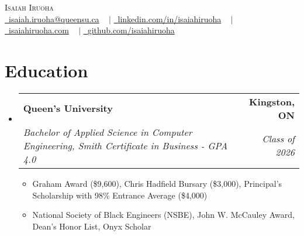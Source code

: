 \documentclass[letterpaper,11pt]{article}
\makeatletter
\newcommand{\resumeItem}[1]{
  \item\small{
    {#1 \vspace{-2pt}}
  }
}
\newcommand{\resumeSubheading}[4]{
  \vspace{-2pt}\item
    \begin{tabular*}{1.0\textwidth}[t]{l@{\extracolsep{\fill}}r}
      \textbf{#1} & \textbf{\small #2} \\
      \textit{\small#3} & \textit{\small #4} \\
    \end{tabular*}\vspace{-7pt}
}
\newcommand{\resumeSubHeadingListStart}{\begin{itemize}[leftmargin=0.0in, label={}]}
\newcommand{\resumeSubHeadingListEnd}{\end{itemize}}
\newcommand{\resumeItemListStart}{\begin{itemize}}
\newcommand{\resumeItemListEnd}{\end{itemize}\vspace{-5pt}}
\makeatother
\begin{document}

\begin{center}
    {\Huge \scshape Isaiah Iruoha} \\ \vspace{5pt}
    \href{mailto:x@gmail.com}{\raisebox{-0.2\height}\  {isaiah.iruoha@queensu.ca}} ~ $\vert$
    \href{https://isaiahiruoha.com}{\raisebox{-0.2\height}\ {linkedin.com/in/isaiahiruoha}}  ~ $\vert$
    \href{https://linkedin.com/in/isaiahiruoha/}{\raisebox{-0.2\height}\ {isaiahiruoha.com}}  ~ $\vert$
    \href{https://github.com/isaiahiruoha}{\raisebox{-0.2\height}\ {github.com/isaiahiruoha}}
    \vspace{-8pt}
\end{center}


\section{Education}
  \resumeSubHeadingListStart
    \resumeSubheading
      {Queen's University}{Kingston, ON}
      {Bachelor of Applied Science in Computer Engineering, Smith Certificate in Business - GPA 4.0}{Class of 2026}
      \resumeItemListStart
        \resumeItem{Graham Award (\$9,600), Chris Hadfield Bursary (\$3,000), Principal's Scholarship with 98\% Entrance Average (\$4,000)}
        \resumeItem{National Society of Black Engineers (NSBE), John W. McCauley Award, Dean's Honor List, Onyx Scholar}
      \resumeItemListEnd
  \resumeSubHeadingListEnd
  \vspace{-12pt}
  
\end{document}
